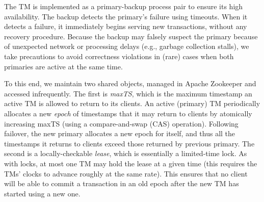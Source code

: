  The TM is implemented as a primary-backup process pair to ensure its high availability. 
The backup detects the primary's failure using timeouts. When it detects a failure, it immediately begins serving new
transactions, without any recovery procedure. Because the backup may falsely suspect the primary because of
unexpected network or processing delays (e.g., garbage collection stalls), we take precautions to avoid correctness
violations in (rare) cases when both primaries are active at the same time.

To this end, we maintain two shared objects, managed in Apache Zookeeper and accessed infrequently.
The first is \emph{maxTS}, which is the maximum timestamp an active TM is allowed to return to its clients.
An active (primary) TM periodically allocates a new \emph{epoch} of timestamps that it may return to clients by atomically
increasing maxTS (using a compare-and-swap (CAS) operation).  
Following failover, the new primary  allocates a new epoch for itself, and thus all the timestamps it returns to clients
exceed those returned by previous primary. 
The second is a locally-checkable \emph{lease}, which is essentially a  limited-time lock. 
As with locks, at most one TM may hold the lease at a given time (this requires the TMs' clocks to advance roughly at the same rate). 
This ensures that no client will be able to commit a transaction in an old epoch after the new TM has started 
using a new one.



